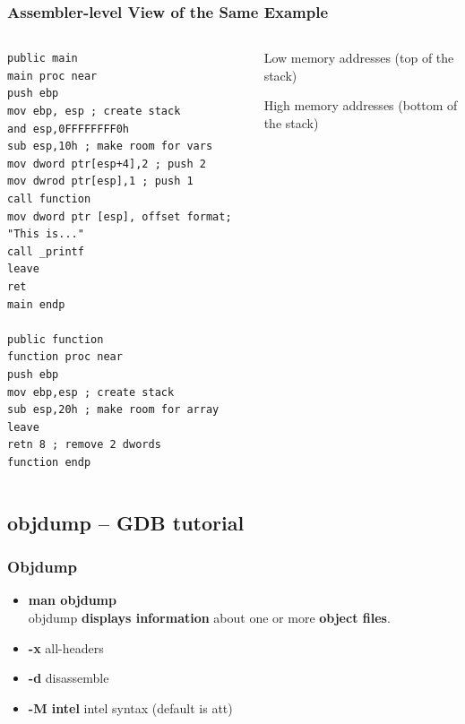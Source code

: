 \documentclass[]{beamer}
\begin{document}
\begin{frame}[fragile]
  \frametitle{Assembler-level View of the Same Example}
  \begin{columns}
    \begin{column}{.5\textwidth}

\begin{lstlisting}[language={[x86masm]Assembler},basicstyle=\tiny\ttfamily]
public main
main proc near
push ebp
mov ebp, esp ; create stack
and esp,0FFFFFFFF0h
sub esp,10h ; make room for vars
mov dword ptr[esp+4],2 ; push 2
mov dwrod ptr[esp],1 ; push 1
call function
mov dword ptr [esp], offset format; "This is..."
call _printf
leave
ret
main endp

public function
function proc near
push ebp
mov ebp,esp ; create stack
sub esp,20h ; make room for array
leave
retn 8 ; remove 2 dwords
function endp
\end{lstlisting}
    \end{column}

    \begin{column}{.5\textwidth}

      \begin{center}
        {\tiny Low memory addresses (top of the stack)}
        \begin{center}
        \end{center}
        {\tiny High memory addresses (bottom of the stack)}
      \end{center}
    \end{column}
  \end{columns}
  \begin{figure}
  \end{figure}
\end{frame}

\subsection{objdump -- GDB tutorial}
\begin{frame}
  \frametitle{Objdump}
  \begin{itemize}
  \item{{\bf man objdump}}\\
objdump \textbf{displays information} about one or more \textbf{object files}.
  \item{\textbf{-x}} all-headers
  \item{\textbf{-d}} disassemble
  \item{\textbf{-M intel}} intel syntax (default is att)
  \end{itemize}
\end{frame}
\end{document}
